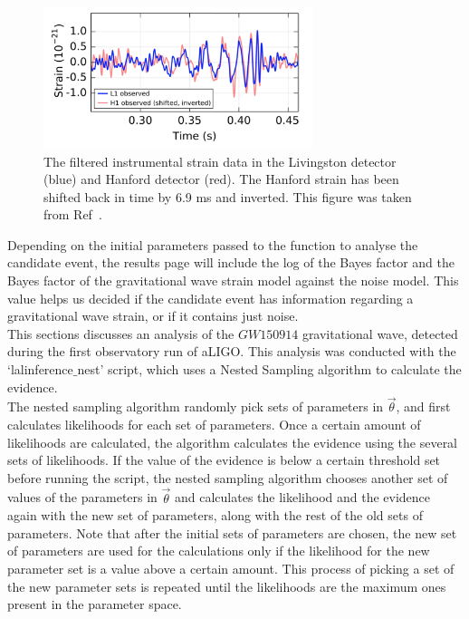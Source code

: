 \documentclass{article}
\begin{document}
 
 
 \begin{figure}[h]
 	\centering
 	\includegraphics[width=0.7\textwidth]{Figures/DataLH.png} 
 	\caption{The filtered instrumental strain data in the Livingston detector (blue) and Hanford detector (red). The Hanford strain has been shifted back in time by 6.9 ms and inverted. This figure was taken from Ref~\cite{ligo2016properties}.
 	}
 	\label{Fig:DataLH}
 \end{figure}
 
 
 Depending on the initial parameters passed to the function to analyse the candidate event, the results page will include the log of the Bayes factor and the Bayes factor of the gravitational wave strain model against the noise model. This value helps us decided if the candidate event has information regarding a gravitational wave strain, or if it contains just noise. \\
 
 
 This sections discusses an analysis of the $GW150914$ gravitational wave, detected during the first observatory run of aLIGO. This analysis was conducted with the `lalinference$\_$nest' script, which uses a Nested Sampling algorithm to calculate the evidence. \\
 
 The nested sampling algorithm randomly pick sets of parameters in $\vec{\theta}$, and first calculates likelihoods for each set of parameters. Once a certain amount of likelihoods are calculated, the algorithm calculates the evidence using the several sets of likelihoods. If the value of the evidence is below a certain threshold set before running the script, the nested sampling algorithm chooses another set of values of the parameters in $\vec{\theta}$ and calculates the likelihood and the evidence again with the new set of parameters, along with the rest of the old sets of parameters. Note that after the initial sets of parameters are chosen, the new set of parameters are used for the calculations only if the likelihood for the new parameter set is a value above a certain amount. This process of picking a set of the new parameter sets is repeated until the likelihoods are the maximum ones present in the parameter space.\\
 
\end{document}
